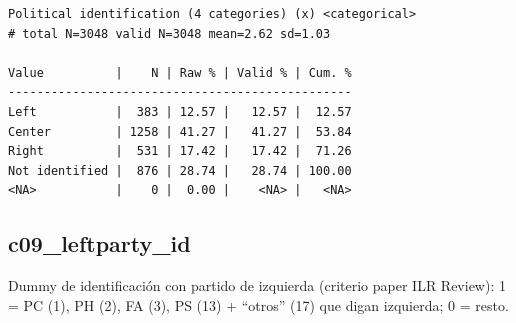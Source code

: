 \documentclass[
  letterpaper,
  DIV=11,
  numbers=noendperiod]{scrreprt}
\newenvironment{Shaded}{\begin{snugshade}}{\end{snugshade}}
\newcommand{\FunctionTok}[1]{\textcolor[rgb]{0.28,0.35,0.67}{#1}}
\newcommand{\NormalTok}[1]{\textcolor[rgb]{0.00,0.23,0.31}{#1}}
\newcommand{\SpecialCharTok}[1]{\textcolor[rgb]{0.37,0.37,0.37}{#1}}
\begin{document}
\begin{Shaded}
\end{Shaded}

\begin{verbatim}
Political identification (4 categories) (x) <categorical> 
# total N=3048 valid N=3048 mean=2.62 sd=1.03

Value          |    N | Raw % | Valid % | Cum. %
------------------------------------------------
Left           |  383 | 12.57 |   12.57 |  12.57
Center         | 1258 | 41.27 |   41.27 |  53.84
Right          |  531 | 17.42 |   17.42 |  71.26
Not identified |  876 | 28.74 |   28.74 | 100.00
<NA>           |    0 |  0.00 |    <NA> |   <NA>
\end{verbatim}

\subsection{c09\_leftparty\_id}\label{c09_leftparty_id}

Dummy de identificación con partido de izquierda (criterio paper ILR
Review): 1 = PC (1), PH (2), FA (3), PS (13) + ``otros'' (17) que digan
izquierda; 0 = resto.

\begin{Shaded}
\end{Shaded}
\end{document}
